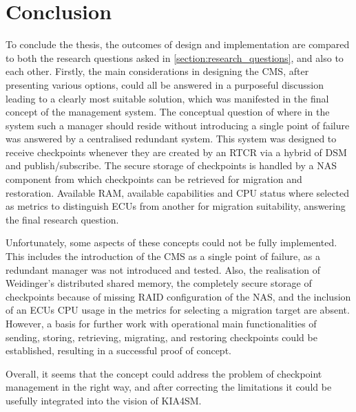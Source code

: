 
\chapter{Conclusion}\label{chapter:conclusion}
To conclude the thesis, the outcomes of design and implementation are compared to both the research questions asked in \ref{section:research_questions}, and also to each other. Firstly, the main considerations in designing the CMS, after presenting various options, could all be answered in a purposeful discussion leading to a clearly most suitable solution, which was manifested in the final concept of the management system. 
The conceptual question of where in the system such a manager should reside without introducing a single point of failure was answered by a centralised redundant system. This system was designed to receive checkpoints whenever they are created by an RTCR via a hybrid of DSM and publish/subscribe. The secure storage of checkpoints is handled by a NAS component from which checkpoints can be retrieved for migration and restoration. Available RAM, available capabilities and CPU status where selected as metrics to distinguish ECUs from another for migration suitability, answering the final research question.

Unfortunately, some aspects of these concepts could not be fully implemented. This includes the introduction of the CMS as a single point of failure, as a redundant manager was not introduced and tested. Also, the realisation of Weidinger's distributed shared memory, the completely secure storage of checkpoints because of missing RAID configuration of the NAS, and the inclusion of an ECUs CPU usage in the metrics for selecting a migration target are absent. However, a basis for further work with operational main functionalities of sending, storing, retrieving, migrating, and restoring checkpoints could be established, resulting in a successful proof of concept. 

Overall, it seems that the concept could address the problem of checkpoint management in the right way, and after correcting the limitations it could be usefully integrated into the vision of KIA4SM.